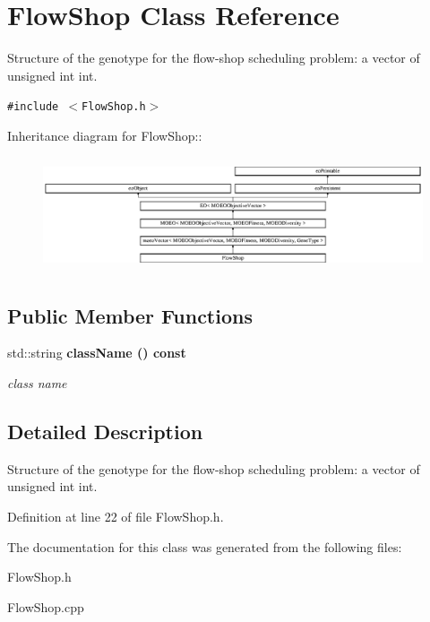 \section{Flow\-Shop Class Reference}
\label{classFlowShop}
Structure of the genotype for the flow-shop scheduling problem: a vector of unsigned int int.  


{\tt \#include $<$Flow\-Shop.h$>$}

Inheritance diagram for Flow\-Shop::\begin{figure}[H]
\begin{center}
\leavevmode
\includegraphics[height=3.3871cm]{classFlowShop}
\end{center}
\end{figure}
\subsection*{Public Member Functions}
\begin{CompactItemize}
\item 
std::string \bf{class\-Name} () const \label{classFlowShop_eaab263664f0078082e723a905d430f3}

\begin{CompactList}\small\item\em class name \item\end{CompactList}\end{CompactItemize}


\subsection{Detailed Description}
Structure of the genotype for the flow-shop scheduling problem: a vector of unsigned int int. 



Definition at line 22 of file Flow\-Shop.h.

The documentation for this class was generated from the following files:\begin{CompactItemize}
\item 
Flow\-Shop.h\item 
Flow\-Shop.cpp\end{CompactItemize}
